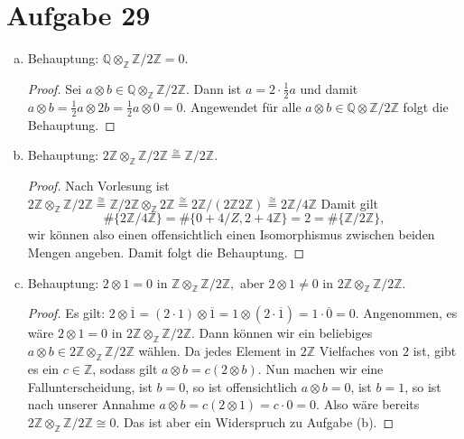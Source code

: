 \documentclass{article}
\theoremstyle{definition}
\newcommand{\Q}{\mathbb{Q}}
\newcommand{\Z}{\mathbb{Z}}
\begin{document}
\section*{Aufgabe 29}
\begin{enumerate}[(a)]
     \item Behauptung: $\Q\otimes_{\Z}\Z/2\Z=0.$
    \begin{proof}
        Sei $a\otimes b \in \Q\otimes_{\Z}\Z/2\Z$. Dann ist $a = 2 \cdot \frac{1}{2}a$ und damit $a\otimes b = \frac{1}{2}a \otimes 2b = \frac{1}{2}a\otimes 0 = 0$. Angewendet für alle $a\otimes b\in \Q \otimes \Z/2\Z$ folgt die Behauptung.
    \end{proof}
    \item Behauptung: $2\Z\otimes_{\Z}\Z/2\Z\overset{\cong}{=}\Z/2\Z.$
    \begin{proof}
        Nach Vorlesung ist $2\Z\otimes_{\Z}\Z/2\Z\overset{\cong}{=}\Z/2\Z\otimes_{\Z}2\Z\overset{\cong}{=}2\Z/(2\Z2\Z)\overset{\cong}{=} 2\Z/4\Z$ Damit gilt 
        $$\#\{2\Z/4\Z\}=\#\{0+4/Z,2+4\Z\}=2=\#\{\Z/2\Z\},$$
        wir können also einen offensichtlich einen Isomorphismus zwischen beiden Mengen angeben.
        Damit folgt die Behauptung.
    \end{proof}
    \item Behauptung: $2\otimes 1=0$ in $\Z\otimes_{\Z}\Z/2\Z,$ aber $2\otimes 1\neq 0$ in $2\Z\otimes_{\Z}\Z/2\Z.$
    \begin{proof}
        Es gilt: $2\otimes \overline{1}=(2\cdot 1)\otimes \overline{1}=1\otimes (2\cdot \overline{1})=1\cdot \overline{0}=0.$
        Angenommen, es wäre $2 \otimes 1 = 0$ in $2\Z\otimes_{\Z}\Z/2\Z$. Dann können wir ein beliebiges $a\otimes b \in 2\Z\otimes_{\Z}\Z/2\Z$ wählen. Da jedes Element in $2\Z$ Vielfaches von $2$ ist, gibt es ein $c\in \Z$, sodass gilt $a\otimes b = c (2\otimes b)$. Nun machen wir eine Fallunterscheidung, ist $b = 0$, so ist offensichtlich $a\otimes b = 0$, ist $b = 1$, so ist nach unserer Annahme $a\otimes b = c(2\otimes 1) = c\cdot 0 = 0$. Also wäre bereits $2\Z\otimes_{\Z}\Z/2\Z \cong 0$. Das ist aber ein Widerspruch zu Aufgabe (b).
    \end{proof}
\end{enumerate}
\end{document}
